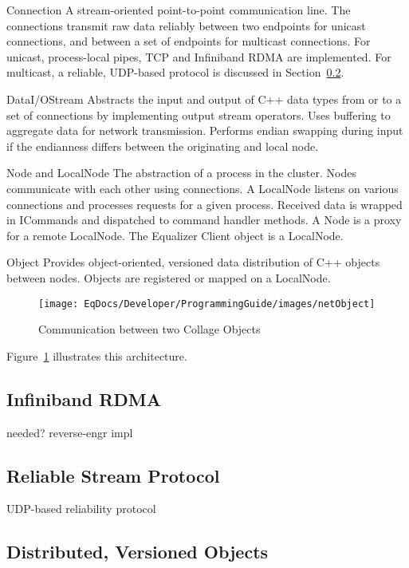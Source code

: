 \documentclass[10pt,journal,compsoc]{IEEEtran}
\newcommand{\sref}[1]{Section~\ref{#1}}
\newcommand{\fig}[1]{Figure~\ref{#1}}
\begin{document}
\begin{compactdesc}
\item[Connection] A stream-oriented point-to-point communication
  line. The connections
  transmit raw data reliably between two endpoints for unicast connections, and
  between a set of endpoints for multicast connections. For unicast,
  process-local pipes, TCP and Infiniband RDMA are implemented. For multicast,
  a reliable, UDP-based protocol is discussed in \sref{SEC_RSP}.
\item[DataI/OStream] Abstracts the input and output of C++ data types from or to
  a set of connections by implementing output stream operators. Uses buffering
  to aggregate data for network transmission. Performs endian swapping during
  input if the endianness differs between the originating and local node.
\item[Node and LocalNode] The abstraction of a process in the cluster. Nodes
  communicate with each other using connections. A LocalNode listens on various
  connections and processes requests for a given process. Received data is
  wrapped in ICommands and dispatched to command handler methods. A Node is a
  proxy for a remote LocalNode. The Equalizer Client object is a LocalNode.
\item[Object] Provides object-oriented, versioned data distribution of C++
  objects between nodes. Objects are registered or mapped on a Local\-Node.
\end{compactdesc}

\begin{figure}[ht]\center
  \texttt{[image: EqDocs/Developer/ProgrammingGuide/images/netObject]}
  \caption{\label{fNetObject}Communication between two Collage Objects}
\end{figure}
\fig{fNetObject} illustrates this architecture.

\subsection{Infiniband RDMA}

needed? reverse-engr impl

\subsection{Reliable Stream Protocol}\label{SEC_RSP}

UDP-based reliability protocol

\subsection{Distributed, Versioned Objects}
\end{document}
